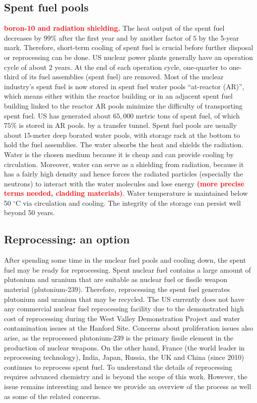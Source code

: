 \documentclass[nofootinbib,preprint,aip,pra]{revtex4-1}
\newcommand{\red}[1]{\textcolor{red}{\bf #1}}
\begin{document}
    \subsection{Spent fuel pools}
    \red{boron-10 and radiation shielding.}
    The heat output of the spent fuel decreases by $99\%$ after the first year and by another factor of $5$
    by the 5-year mark.\cite{aa12} Therefore, short-term cooling of spent fuel is crucial before
    further disposal or reprocessing can be done.
    US nuclear power plants generally have an operation cycle of about 2 years. At the end of each operation cycle,
    one-quarter to one-third of its fuel assemblies (spent fuel) are removed.
    Most of the nuclear industry's spent fuel is now stored in spent fuel water pools ``at-reactor (AR)'',
    which means either within the reactor building or in an adjacent spent fuel building linked to the reactor
    AR pools minimize the difficulty of transporting spent fuel.\cite{iaea99}
    US has generated about $65,000$ metric tons of spent fuel, of which $75\%$ is stored in AR pools.\cite{a11}
    by a transfer tunnel. 
    Spent fuel pools  are usually about 15-meter deep borated water pools, with storage rack at the bottom to hold the fuel assemblies.
    The water absorbs the heat and shields the radiation. Water is the chosen medium because it is cheap and
    can provide cooling by circulation. Moreover, water can serve as a shielding from radiation, because it has a
    fairly high density and hence forces the radiated particles (especially the neutrons) to interact with
    the water molecules and lose energy \red{(more precise terms needed, cladding materials)}. Water temperature is maintained
    below 50 $^\circ$C via circulation and cooling. The integrity of the storage can persist well beyond 
    50 years.\cite{a11, iaea99}

    \subsection{Reprocessing: an option}
    \label{sec:reproc}
    After spending some time in the nuclear fuel pools and cooling down, the spent fuel may be ready
    for reprocessing.
    Spent nuclear fuel contains a large amount of plutonium and uranium that are suitable as nuclear fuel
    or fissile weapon material (plutonium-239). Therefore, reprocessing the spent fuel generates plutonium and
    uranium that may be recycled. The US currently does not have any commercial nuclear fuel
    reprocessing facility due to the demonstrated high cost of reprocessing
    during the West Valley Demonstration Project and water contamination issues at the Hanford Site.
    Concerns about proliferation issues also arise, as the 
    reprocessed plutonium-239 is the primary fissile element in the production of nuclear weapons.\cite{aa12}
    On the other hand, France (the world leader in reprocessing technology), India, Japan, Russia, the UK
    and China (since 2010) continues to reprocess spent fuel. To understand the details of reprocessing
    requires advanced chemistry and is beyond the scope of this work. However, the issue remains interesting
    and hence we provide an overview of the process as well as some of the related concerns.
\end{document}
